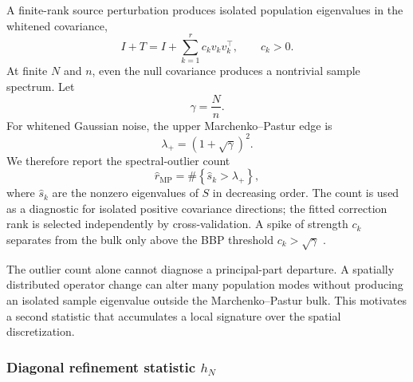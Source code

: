 \documentclass[11pt]{article}
\numberwithin{table}{section}
\numberwithin{figure}{section}
\begin{document}
A finite-rank source perturbation produces isolated population eigenvalues in the whitened covariance,
\begin{equation}
    I+T
    =
    I
    +
    \sum_{k=1}^{r}c_kv_kv_k^\top,
    \qquad c_k>0 .
\end{equation}
At finite $N$ and $n$, even the null covariance produces a nontrivial sample spectrum. Let
\begin{equation}
    \gamma=\frac{N}{n}.
\end{equation}
For whitened Gaussian noise, the upper Marchenko--Pastur edge \citep{MarchenkoPastur1967} is
\begin{equation}
    \lambda_+
    =
    \left(1+\sqrt{\gamma}\right)^2 .
    \label{eq:mp_edge}
\end{equation}
We therefore report the spectral-outlier count
\begin{equation}
    \widehat r_{\mathrm{MP}}
    =
    \#\left\{
    \widehat s_k>\lambda_+
    \right\},
    \label{eq:rmp}
\end{equation}
where $\widehat s_k$ are the nonzero eigenvalues of $S$ in decreasing order. The count is used as a diagnostic for isolated positive covariance directions; the fitted correction rank is selected independently by cross-validation. A spike of strength $c_k$ separates from the bulk only above the BBP threshold $c_k>\sqrt\gamma$ \citep{BaikSilverstein2006}.

The outlier count alone cannot diagnose a principal-part departure. A spatially distributed operator change can alter many population modes without producing an isolated sample eigenvalue outside the Marchenko--Pastur bulk. This motivates a second statistic that accumulates a local signature over the spatial discretization.

\subsubsection{Diagonal refinement statistic $h_N$}
\label{sec:diag_stat}
\end{document}
